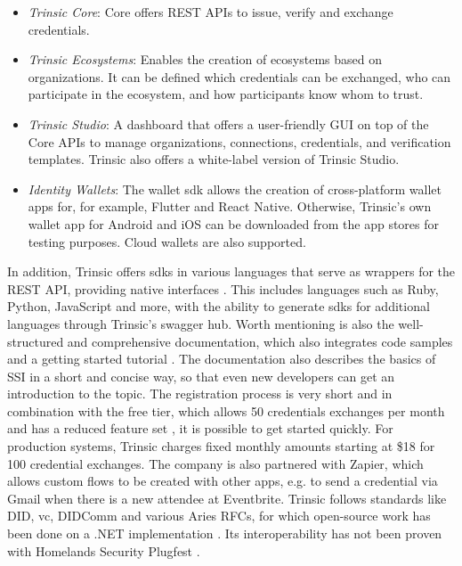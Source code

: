     \begin{itemize}
        \item \textit{Trinsic Core}: Core offers REST APIs to issue, verify and exchange credentials. \cite{trinsic_trinsic_2021-1}
        \item \textit{Trinsic Ecosystems}: Enables the creation of ecosystems based on organizations. It can be defined which credentials can be exchanged, who can participate in the ecosystem, and how participants know whom to trust. \cite{trinsic_trinsic_2021-2}
        \item \textit{Trinsic Studio}: A dashboard that offers a user-friendly GUI on top of the Core APIs to manage organizations, connections, credentials, and verification templates. Trinsic also offers a white-label version of Trinsic Studio. \cite{trinsic_trinsic_2021-3}
        \item \textit{Identity Wallets}: The wallet \ac{sdk} allows the creation of cross-platform wallet apps for, for example, Flutter and React Native. Otherwise, Trinsic's own wallet app for Android and iOS can be downloaded from the app stores for testing purposes. Cloud wallets are also supported. \cite{trinsic_identity_2021}
    \end{itemize}
    
    In addition, Trinsic offers \acp{sdk} in various languages that serve as wrappers for the REST API, providing native interfaces \cite{trinsic_service_2021}. This includes languages such as Ruby, Python, JavaScript and more, with the ability to generate \acp{sdk} for additional languages through Trinsic's swagger hub. Worth mentioning is also the well-structured and comprehensive documentation, which also integrates code samples and a getting started tutorial \cite{trinsic_introduction_2021}. The documentation also describes the basics of \ac{SSI} in a short and concise way, so that even new developers can get an introduction to the topic. The registration process is very short and in combination with the free tier, which allows 50 credentials exchanges per month and has a reduced feature set \cite{trinsic_pricing_2021}, it is possible to get started quickly. For production systems, Trinsic charges fixed monthly amounts starting at \$18 for 100 credential exchanges. The company is also partnered with Zapier, which allows custom flows to be created with other apps, e.g. to send a credential via Gmail when there is a new attendee at Eventbrite. Trinsic follows standards like \ac{DID}, \ac{vc}, DIDComm and various Aries \acp{RFC}, for which open-source work has been done on a .NET implementation \cite{trinsic_open_2021}. Its interoperability has not been proven with Homelands Security Plugfest \cite{homeland_security_interoperability_2021}.
    

